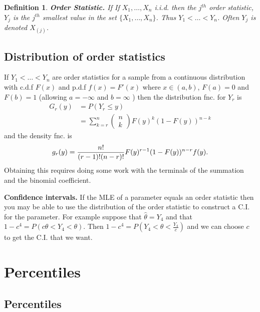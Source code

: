\documentclass[10pt, two column]{article}
\newtheorem{definition}{Definition}[subsection]
\begin{document}
\begin{definition}
{\bf Order Statistic.} If If $X_{1}, \dots, X_{n}$ i.i.d. then the $j^{th}$ order statistic, $Y_{j}$ is the $j^{th}$ smallest value in the set $\{X_{1}, \dots, X_{n}\}$. Thus $Y_{1} < \dots < Y_{n}$. Often $Y_{j}$ is denoted $X_{(j)}$. 
\end{definition}

\subsection{Distribution of order statistics}

If $Y_{1} < \dots < Y_{n}$ are order statistics for a sample from a continuous distribution with c.d.f $F(x)$ and p.d.f $f(x) = F'(x)$ where $x \in(a,b)$, $F(a) = 0$ and $F(b) = 1$ (allowing $a = -\infty$ and $b = \infty$  ) then the distribution fnc. for $Y_{r}$ is \vspace{-6pt}
\begin{align*}
G_{r}(y) &= P(Y_{r} \leq y) \\
&= \sum_{k=r}^{n} \left( \begin{matrix} n \\ k \end{matrix}\right) F(y)^{k} (1 - F(y))^{n-k}   
\end{align*} 
and the density fnc. is \vspace{-6pt}
\[ g_{r}(y) = \frac{n!}{(r-1)! (n-r)!} F(y)^{r-1} (1 - F(y))^{n-r} f(y). \vspace{-6pt} \]
Obtaining this requires doing some work with the terminals of the summation and the binomial coefficient. 

{\bf Confidence intervals.} If the MLE of a parameter equals an order statistic then you may be able to use the distribution of the order statistic to construct a C.I. for the parameter. For example suppose that $\widehat{\theta} = Y_{4}$ and that $1 - c^{4} = P(c\theta < Y_{4} < \theta)$. Then $1 - c^{4} = P(Y_{4} < \theta < \frac{Y_{4}}{c})$ and we can choose $c$ to get the C.I. that we want. 

\section{Percentiles}

\subsection{Percentiles}
\end{document}
